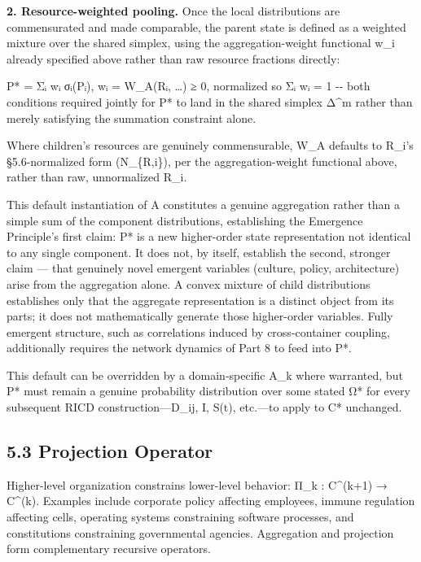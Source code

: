 \documentclass[
]{article}
\begin{document}
\textbf{2. Resource-weighted pooling.} Once the local distributions are
commensurated and made comparable, the parent state is defined as a
weighted mixture over the shared simplex, using the aggregation-weight
functional w\_i already specified above rather than raw resource
fractions directly:

P* = Σᵢ wᵢ σᵢ(Pᵢ), wᵢ = W\_A(Rᵢ, \ldots) ≥ 0, normalized so Σᵢ wᵢ = 1
-\/- both conditions required jointly for P* to land in the shared
simplex Δ\^{}m rather than merely satisfying the summation constraint
alone.

Where children's resources are genuinely commensurable, W\_A defaults to
R\_i's §5.6-normalized form (N\_\{R,i\}), per the aggregation-weight
functional above, rather than raw, unnormalized R\_i.

This default instantiation of A constitutes a genuine aggregation rather
than a simple sum of the component distributions, establishing the
Emergence Principle's first claim: P* is a new higher-order state
representation not identical to any single component. It does not, by
itself, establish the second, stronger claim --- that genuinely novel
emergent variables (culture, policy, architecture) arise from the
aggregation alone. A convex mixture of child distributions establishes
only that the aggregate representation is a distinct object from its
parts; it does not mathematically generate those higher-order variables.
Fully emergent structure, such as correlations induced by
cross-container coupling, additionally requires the network dynamics of
Part 8 to feed into P*.

This default can be overridden by a domain-specific A\_k where
warranted, but P* must remain a genuine probability distribution over
some stated Ω* for every subsequent RICD construction---D\_ij, I, S(t),
etc.---to apply to C* unchanged.

\hypertarget{projection-operator}{%
\subsection{5.3 Projection Operator}\label{projection-operator}}

Higher-level organization constrains lower-level behavior: Π\_k :
C\^{}(k+1) → C\^{}(k). Examples include corporate policy affecting
employees, immune regulation affecting cells, operating systems
constraining software processes, and constitutions constraining
governmental agencies. Aggregation and projection form complementary
recursive operators.
\end{document}
